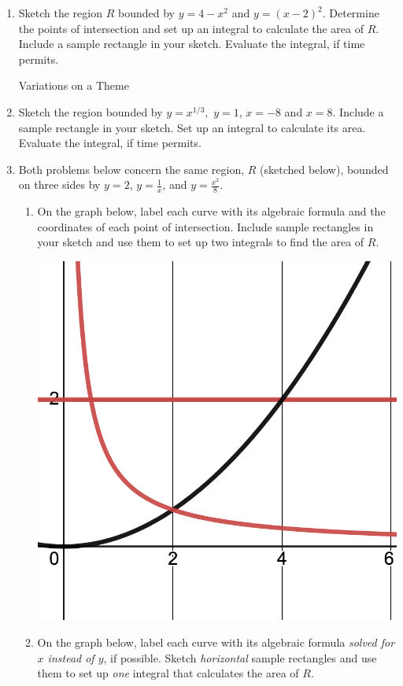 \documentclass[11pt,fleqn]{article}
\begin{document}
\begin{enumerate}
\vspace{2in}

\item Sketch the region $R$ bounded by $y=4-x^2$ and $y=(x-2)^2.$ Determine the points of intersection and set up an integral to calculate the area of $R.$ Include a sample rectangle in your sketch. Evaluate the integral, if time permits.
\vfill
\newpage
\begin{center} Variations on a Theme \end{center}
\item Sketch the region bounded by $y=x^{1/3},$ $y=1$, $x=-8$ and $x=8.$  Include a sample rectangle in your sketch. Set up an integral to calculate its area.  Evaluate the integral, if time permits.
\vfill
\item Both problems below concern the same region, $R$ (sketched below), bounded on three sides by $y=2$, $y=\frac{1}{x}$, and $y=\frac{x^2}{8}.$\\
	\begin{enumerate}
	\item On the graph below, label each curve with its algebraic formula and the coordinates of each point of intersection. Include sample rectangles in your sketch and use them to set up two integrals to find the area of $R$. 
	
\includegraphics[scale=0.15]{pic-2-1-b.png}
\item On the graph below, label each curve with its algebraic formula \emph{solved for $x$ instead of $y$}, if possible.  Sketch \emph{horizontal} sample rectangles and use them to set up \emph{one} integral that calculates the area of $R$. 
	

\end{enumerate}
\end{enumerate}
\end{document}
